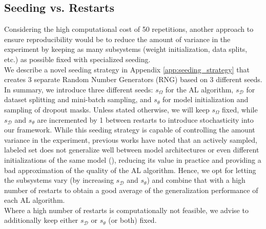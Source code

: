 \documentclass[]{article}
\begin{document}
\subsection{Seeding vs. Restarts}\label{sec:reproducibility}
Considering the high computational cost of 50 repetitions, another approach to ensure reproducibility would be to reduce the amount of variance in the experiment by keeping as many subsystems (weight initialization, data splits, etc.) as possible fixed with specialized seeding. \\
We describe a novel seeding strategy in Appendix \ref{app:seeding_strategy} that creates 3 separate Random Number Generators (RNG) based on 3 different seeds.
In summary, we introduce three different seeds: $s_\Omega$ for the AL algorithm, $s_\mathcal{D}$ for dataset splitting and mini-batch sampling, and $s_\theta$ for model initialization and sampling of dropout masks.
Unless stated otherwise, we will keep $s_\Omega$ fixed, while $s_\mathcal{D}$ and $s_\theta$ are incremented by 1 between restarts to introduce stochasticity into our framework.
While this seeding strategy is capable of controlling the amount variance in the experiment, previous works have noted that an actively sampled, labeled set does not generalize well between model architectures or even different initializations of the same model (\cite{zhou2021towards, lowell2018practical}), reducing its value in practice and providing a bad approximation of the quality of the AL algorithm.
Hence, we opt for letting the subsystems vary (by increasing $s_\mathcal{D}$ and $s_\theta$) and combine that with a high number of restarts to obtain a good average of the generalization performance of each AL algorithm. \\
Where a high number of restarts is computationally not feasible, we advise to additionally keep either $s_\mathcal{D}$ or $s_\theta$ (or both) fixed.


\end{document}

